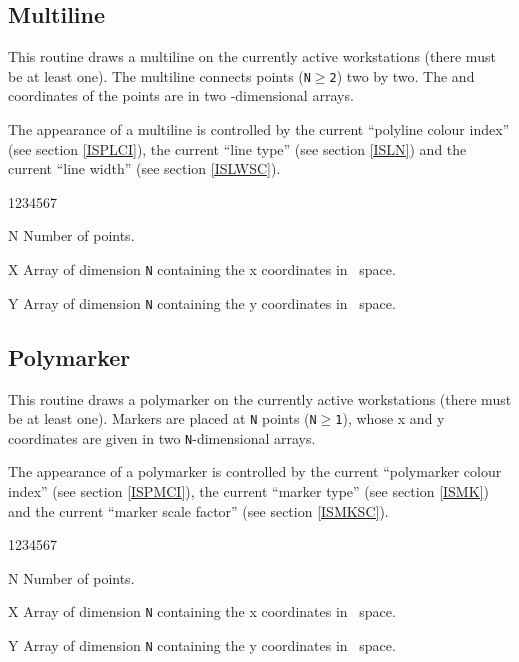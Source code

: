 \subsection{Multiline}
\Action
This routine draws a multiline on the currently active workstations (there must
be at least one). The multiline connects  points ({\tt N$\geq$2}) two
by two. The  and  coordinates of the points are in two 
-dimensional arrays.

The appearance of a multiline is controlled by the current ``polyline colour
index'' (see  section \ref{ISPLCI}), the current
``line type'' (see  section \ref{ISLN}) and the current
``line width'' (see  section \ref{ISLWSC}).
\Pdesc
\begin{DLtt}{1234567}
\item[N] Number of points.
\item[X] Array of dimension {\tt N} containing the x coordinates in \wc~space.
\item[Y] Array of dimension {\tt N} containing the y coordinates in \wc~space.
\end{DLtt}

\newpage

\subsection{Polymarker}
\Action
This routine draws a polymarker on the currently active workstations (there must
be at least one). Markers are placed at {\tt N} points ({\tt N$\geq$1}), whose x
and y coordinates are given in two {\tt N}-dimensional arrays.

The appearance of a polymarker is controlled by the current ``polymarker colour
index'' (see  section \ref{ISPMCI}), the current ``marker
type'' (see  section \ref{ISMK}) and the current ``marker
scale factor'' (see  section \ref{ISMKSC}).
\Pdesc
\begin{DLtt}{1234567}
\item[N] Number of points.
\item[X] Array of dimension {\tt N} containing the x coordinates in \wc~space.
\item[Y] Array of dimension {\tt N} containing the y coordinates in \wc~space.
\end{DLtt}


